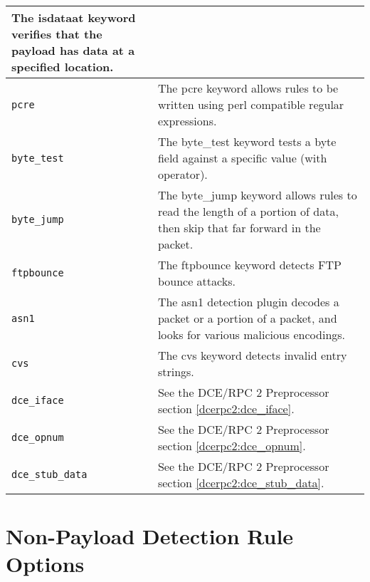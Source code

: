 \documentclass[english]{report}
\begin{document}
\begin{center}
\begin{longtable}[h]{| p{1in} | p{4.5in} |}
The isdataat keyword verifies that the payload has data at a specified
location. \\

\hline
\texttt{pcre} &

The pcre keyword allows rules to be written using perl compatible regular
expressions. \\

\hline
\texttt{byte\_test} &

The byte\_test keyword tests a byte field against a specific value (with
operator). \\

\hline
\texttt{byte\_jump} &

The byte\_jump keyword allows rules to read the length of a portion of data,
then skip that far forward in the packet. \\

\hline
\texttt{ftpbounce} &

The ftpbounce keyword detects FTP bounce attacks. \\


\hline
\texttt{asn1} &

The asn1 detection plugin decodes a packet or a portion of a packet, and looks
for various malicious encodings. \\

\hline
\texttt{cvs} &

The cvs keyword detects invalid entry strings. \\

\hline
\texttt{dce\_iface} &

See the DCE/RPC 2 Preprocessor section \ref{dcerpc2:dce_iface}. \\

\hline
\texttt{dce\_opnum} &

See the DCE/RPC 2 Preprocessor section \ref{dcerpc2:dce_opnum}. \\

\hline
\texttt{dce\_stub\_data} &

See the DCE/RPC 2 Preprocessor section \ref{dcerpc2:dce_stub_data}. \\

\hline
\end{longtable}
\end{center}

\section{Non-Payload Detection Rule Options}
\end{document}
